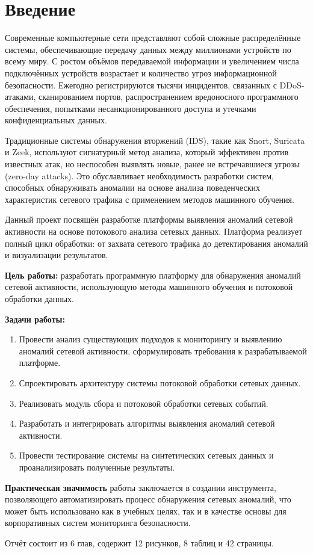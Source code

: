 \chapter*{Введение}

Современные компьютерные сети представляют собой сложные распределённые системы, обеспечивающие передачу данных между миллионами устройств по всему миру. С ростом объёмов передаваемой информации и увеличением числа подключённых устройств возрастает и количество угроз информационной безопасности. Ежегодно регистрируются тысячи инцидентов, связанных с DDoS-атаками, сканированием портов, распространением вредоносного программного обеспечения, попытками несанкционированного доступа и утечками конфиденциальных данных.

Традиционные системы обнаружения вторжений (IDS), такие как Snort, Suricata и Zeek, используют сигнатурный метод анализа, который эффективен против известных атак, но неспособен выявлять новые, ранее не встречавшиеся угрозы (zero-day attacks). Это обуславливает необходимость разработки систем, способных обнаруживать аномалии на основе анализа поведенческих характеристик сетевого трафика с применением методов машинного обучения.

Данный проект посвящён разработке платформы выявления аномалий сетевой активности на основе потокового анализа сетевых данных. Платформа реализует полный цикл обработки: от захвата сетевого трафика до детектирования аномалий и визуализации результатов.

\textbf{Цель работы:} разработать программную платформу для обнаружения аномалий сетевой активности, использующую методы машинного обучения и потоковой обработки данных.

\textbf{Задачи работы:}
\begin{enumerate}
    \item Провести анализ существующих подходов к мониторингу и выявлению аномалий сетевой активности, сформулировать требования к разрабатываемой платформе.
    \item Спроектировать архитектуру системы потоковой обработки сетевых данных.
    \item Реализовать модуль сбора и потоковой обработки сетевых событий.
    \item Разработать и интегрировать алгоритмы выявления аномалий сетевой активности.
    \item Провести тестирование системы на синтетических сетевых данных и проанализировать полученные результаты.
\end{enumerate}

\textbf{Практическая значимость} работы заключается в создании инструмента, позволяющего автоматизировать процесс обнаружения сетевых аномалий, что может быть использовано как в учебных целях, так и в качестве основы для корпоративных систем мониторинга безопасности.

Отчёт состоит из 6 глав, содержит 12 рисунков, 8 таблиц и 42 страницы.
